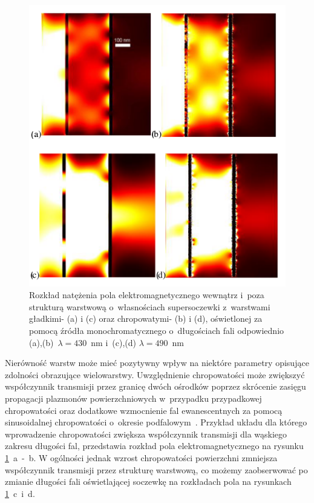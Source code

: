 \begin{figure}[!hbt]
	\begin{center}
	\includegraphics[width=.9\textwidth]{images/multilayer/plp-chropo.png}
	\end{center}
	\caption{Rozkład natężenia pola elektromagnetycznego wewnątrz i~poza strukturą warstwową o~własnościach supersoczewki z~warstwami gładkimi- (a) i (c) oraz chropowatymi- (b) i (d), oświetlonej za pomocą źródła monochromatycznego o~długościach fali odpowiednio (a),(b)~$\lambda=430$~nm  i~(c),(d) $\lambda=490$~nm~\cite{Stolarek_2013}}
	\label{fig:plp-chropo-fdtd}
\end{figure}

Nierówność warstw może mieć pozytywny wpływ na niektóre parametry opisujące zdolności obrazujące wielowarstwy. Uwzględnienie chropowatości może zwiększyć współczynnik transmisji przez granicę dwóch ośrodków poprzez skrócenie zasięgu propagacji plazmonów powierzchniowych w~przypadku przypadkowej chropowatości oraz dodatkowe wzmocnienie fal ewanescentnych za pomocą sinusoidalnej chropowatości o~okresie podfalowym~\cite{huang2012subwavelength}. Przykład układu dla którego wprowadzenie chropowatości zwiększa współczynnik transmisji dla wąskiego zakresu długości fal, przedstawia rozkład pola elektromagnetycznego na rysunku \ref{fig:plp-chropo-fdtd}~a~-~b. W ogólności jednak wzrost chropowatości powierzchni zmniejsza współczynnik transmisji przez strukturę warstwową, co możemy zaobserwować po zmianie długości fali oświetlającej soczewkę na rozkładach pola na rysunkach \ref{fig:plp-chropo-fdtd}~c~i~d. 

